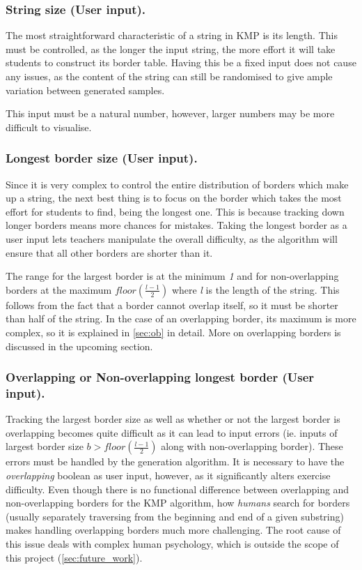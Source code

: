 \documentclass{l4proj}
\begin{document}
\subsubsection{String size (User input).}

The most straightforward characteristic of a string in KMP is its length. This must be controlled, as the longer the input string, the more effort it will take students to construct its border table. Having this be a fixed input does not cause any issues, as the content of the string can still be randomised to give ample variation between generated samples.

This input must be a natural number, however, larger numbers may be more difficult to visualise.

\subsubsection{Longest border size (User input).}

Since it is very complex to control the entire distribution of borders which make up a string, the next best thing is to focus on the border which takes the most effort for students to find, being the longest one. This is because tracking down longer borders means more chances for mistakes. Taking the longest border as a user input lets teachers manipulate the overall difficulty, as the algorithm will ensure that all other borders are shorter than it.

The range for the largest border is at the minimum \emph{1} and for non-overlapping borders at the maximum $floor(\frac{l-1}{2})$ where \emph{l} is the length of the string. This follows from the fact that a border cannot overlap itself, so it must be shorter than half of the string. In the case of an overlapping border, its maximum is more complex, so it is explained in \autoref{sec:ob} in detail. More on overlapping borders is discussed in the upcoming section.

\subsubsection{Overlapping or Non-overlapping longest border (User input).}

Tracking the largest border size as well as whether or not the largest border is overlapping becomes quite difficult as it can lead to input errors (ie. inputs of largest border size $b > floor(\frac{l-1}{2})$ along with non-overlapping border). These errors must be handled by the generation algorithm. It is necessary to have the \emph{overlapping} boolean as user input, however, as it significantly alters exercise difficulty. Even though there is no functional difference between overlapping and non-overlapping borders for the KMP algorithm, how \emph{humans} search for borders (usually separately traversing from the beginning and end of a given substring) makes handling overlapping borders much more challenging. The root cause of this issue deals with complex human psychology, which is outside the scope of this project (\autoref{sec:future_work}).
\end{document}
